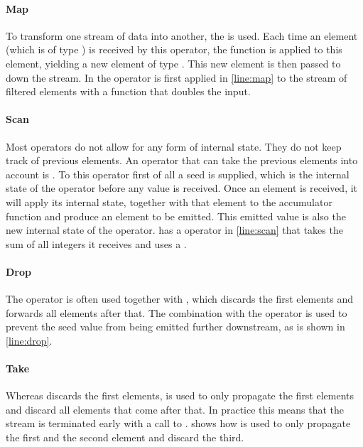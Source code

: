 \paragraph{Map}To transform one stream of data into another, the  is used. Each time an element (which is of type ) is received by this operator, the function  is applied to this element, yielding a new element of type . This new element is then passed to down the stream. In  the  operator is first applied in \cref{line:map} to the stream of filtered elements with a function that doubles the input.

\paragraph{Scan}Most operators do not allow for any form of internal state. They do not keep track of previous elements. An operator that can take the previous elements into account is . To this operator first of all a seed is supplied, which is the internal state of the operator before any value is received. Once an element is received, it will apply its internal state, together with that element to the accumulator function  and produce an element to be emitted. This emitted value is also the new internal state of the operator.  has a  operator in \cref{line:scan} that takes the sum of all integers it receives and uses a .

\paragraph{Drop}The  operator is often used together with , which discards the first  elements and forwards all elements after that. The combination with the  operator is used to prevent the seed value from being emitted further downstream, as is shown in  \cref{line:drop}.

\paragraph{Take}Whereas  discards the first  elements,  is used to only propagate the first  elements and discard all elements that come after that. In practice this means that the stream is terminated early with a call to .  shows how  is used to only propagate the first and the second element and discard the third.

